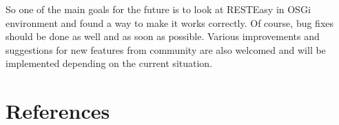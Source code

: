 \documentclass[12pt,final,oneside]{fithesis2}
\begin{document}
So one of the main goals for the future is to look at RESTEasy in OSGi environment and found a way to make it works correctly. Of course, bug fixes should be done as well and as soon as possible. Various improvements and suggestions for new features from community are also welcomed and will be implemented depending on the current situation.




\begingroup
\def\tmpchapter{0}
\renewcommand{\chaptername}{}
\renewcommand{\thechapter}{}
\chapter{References}
\renewcommand{\chapter}[2]{}%



\end{document}
